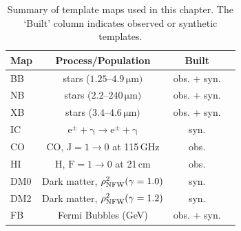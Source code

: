 \documentclass[doublespace,nopageskip]{VTthesis}
\begin{document}

\begin{table}[htb]
	\centering
	\caption{Summary of template maps used in this chapter. The `Built' column indicates observed or synthetic templates.}
	\begin{tabular}{lccc}
        \toprule
		Map & Process/Population                                  & Built               \\
		\midrule
		{BB}  & stars ($1.25$--$4.9\,\mathrm{\mu m})$     & obs. + syn.        \\
		{NB}  & stars  ($2.2$--$240\,\mathrm{\mu m})$     & obs. + syn. \\
		{XB}  & stars ($3.4$--$4.6\,\mathrm{\mu m})$     & obs. + syn. \\ 
		{IC}  & $\mathrm{e^{\pm}+\gamma \rightarrow e^{\pm}+\gamma}$ & syn.        \\
		{CO}  & CO, $\mathrm{J=1 \rightarrow 0}$ at 115\,GHz            & obs.        \\
		{HI}  & H, $\mathrm{F=1 \rightarrow 0}$ at 21\,cm               & obs.        \\
		{DM0} & Dark matter, $\rho_{\rm NFW}^2(\gamma=1.0)$             & syn.        \\
		{DM2} & Dark matter, $\rho_{\rm NFW}^2(\gamma=1.2)$             & syn.        \\
		{FB}  & Fermi Bubbles (GeV)                                 & obs. + syn. \\
		\bottomrule
	\end{tabular}
	\label{tab:maps}
\end{table}
\end{document}
